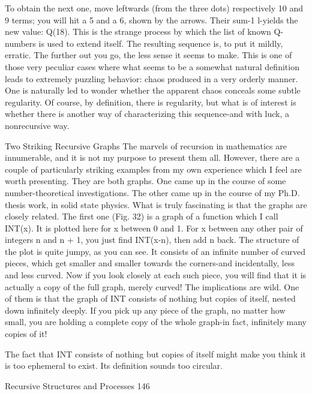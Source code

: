 To obtain the next one, move leftwards (from the three dots) respectively 10 and 9 terms;
you will hit a 5 and a 6, shown by the arrows. Their sum-1 l-yields the new value: Q(18).
This is the strange process by which the list of known Q-numbers is used to extend itself.
The resulting sequence is, to put it mildly, erratic. The further out you go, the less sense it
seems to make. This is one of those very peculiar cases where what seems to be a
somewhat natural definition leads to extremely puzzling behavior: chaos produced in a
very orderly manner. One is naturally led to wonder whether the apparent chaos conceals
some subtle regularity. Of course, by definition, there is regularity, but what is of interest
is whether there is another way of characterizing this sequence-and with luck, a
nonrecursive way.

                          Two Striking Recursive Graphs
The marvels of recursion in mathematics are innumerable, and it is not my purpose to
present them all. However, there are a couple of particularly striking examples from my
own experience which I feel are worth presenting. They are both graphs. One came up in
the course of some number-theoretical investigations. The other came up in the course of
my Ph.D. thesis work, in solid state physics. What is truly fascinating is that the graphs
are closely related.
         The first one (Fig. 32) is a graph of a function which I call INT(x). It is plotted
here for x between 0 and 1. For x between any other pair of integers n and n + 1, you just
find INT(x-n), then add n back. The structure of the plot is quite jumpy, as you can see. It
consists of an infinite number of curved pieces, which get smaller and smaller towards
the corners-and incidentally, less and less curved. Now if you look closely at each such
piece, you will find that it is actually a copy of the full graph, merely curved! The
implications are wild. One of them is that the graph of INT consists of nothing but copies
of itself, nested down infinitely deeply. If you pick up any piece of the graph, no matter
how small, you are holding a complete copy of the whole graph-in fact, infinitely many
copies of it!

The fact that INT consists of nothing but copies of itself might make you think it is too
ephemeral to exist. Its definition sounds too circular.




Recursive Structures and Processes                                                         146

